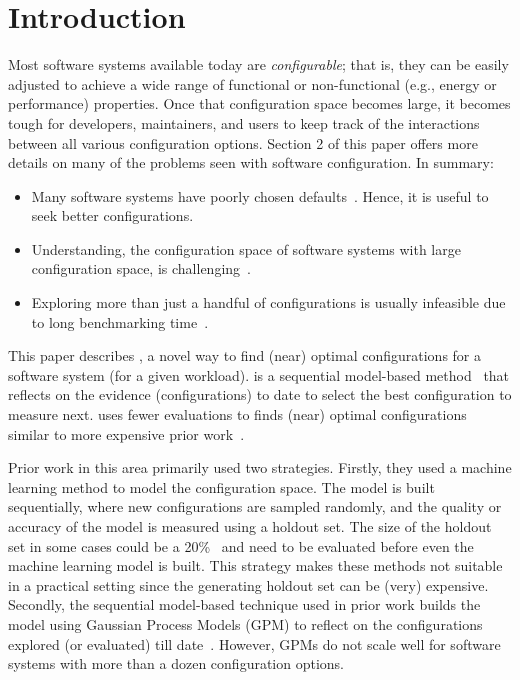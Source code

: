 \section{Introduction}\label{sec:intro}

\noindent
Most software systems available today are {\em configurable}; that is, they can be easily adjusted to achieve
a wide range of functional or non-functional (e.g., energy or
performance) properties.  Once that configuration space
becomes large, it becomes tough for developers, maintainers, and users to keep track of the interactions between all various configuration
options. Section 2 of this paper offers more details on many of the problems seen with software configuration. In summary:
\begin{itemize}[leftmargin=*]
\item Many software systems have poorly chosen defaults~\cite{van2017automatic,herodotou2011starfish}. Hence, it is useful to seek better configurations.
\item Understanding, the configuration space of software systems with large configuration space, is challenging~\cite{xu2015hey}.
\item Exploring more than just a handful of configurations is usually infeasible due to long benchmarking time~\cite{zhu2017optimized}.
\end{itemize}
This paper describes \flash,  a novel way to find (near) optimal configurations for a software system (for a given workload). 
\flash is
a sequential model-based method~\cite{alipourfard2017cherrypick, snoek2012practical, brochu2010tutorial}
that reflects
on the evidence (configurations) to date to select the best
configuration to measure next.
\flash  uses fewer evaluations to finds (near) optimal configurations similar to more expensive prior work~\cite{guo2013variability, sarkar2015cost, nair17, nair2017using, guo2017data}.

Prior work in this area primarily used two strategies. Firstly, they used a machine learning method to model the configuration space. The model is built sequentially, where new configurations are sampled randomly, and the quality or accuracy of the model is measured using a holdout set. The size of the holdout set in some cases could be a 20\%~\cite{nair2017using}  and need to be evaluated before even the machine learning model is built. This strategy makes these methods not suitable in a practical setting since the generating holdout set can be (very) expensive. Secondly, the sequential model-based technique used in prior work builds the model using Gaussian Process Models (GPM) to reflect on the configurations explored (or evaluated) till date~\cite{zuluaga2016varepsilon}. However, GPMs do not scale well for software systems with more than a dozen configuration options. 

